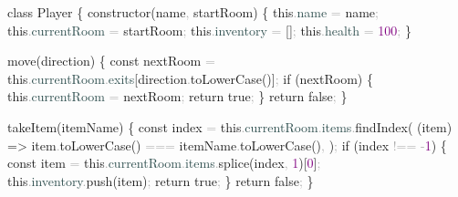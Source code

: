 \documentclass[
  justified,
  openright,
]{tufte-book}
\newcommand{\AttributeTok}[1]{\textcolor{DarkSlateGray}{#1}}
\newcommand{\ControlFlowTok}[1]{\textcolor{BrandBlue}{#1}}
\newcommand{\DecValTok}[1]{\textcolor{Purple}{#1}}
\newcommand{\FunctionTok}[1]{\textcolor{BrandBlue}{#1}}
\newcommand{\KeywordTok}[1]{\textcolor{BrandBlue}{#1}}
\newcommand{\NormalTok}[1]{#1}
\newcommand{\OperatorTok}[1]{\textcolor{DarkGray}{#1}}
\newenvironment{Shaded}{%
  \begin{snugshade}
}{%
  \end{snugshade}
}
\begin{document}
\begin{Shaded}
\begin{Highlighting}[]
\KeywordTok{class}\NormalTok{ Player \{}
  \FunctionTok{constructor}\NormalTok{(name}\OperatorTok{,}\NormalTok{ startRoom) \{}
    \KeywordTok{this}\OperatorTok{.}\AttributeTok{name} \OperatorTok{=}\NormalTok{ name}\OperatorTok{;}
    \KeywordTok{this}\OperatorTok{.}\AttributeTok{currentRoom} \OperatorTok{=}\NormalTok{ startRoom}\OperatorTok{;}
    \KeywordTok{this}\OperatorTok{.}\AttributeTok{inventory} \OperatorTok{=}\NormalTok{ []}\OperatorTok{;}
    \KeywordTok{this}\OperatorTok{.}\AttributeTok{health} \OperatorTok{=} \DecValTok{100}\OperatorTok{;}
\NormalTok{  \}}

  \FunctionTok{move}\NormalTok{(direction) \{}
    \KeywordTok{const}\NormalTok{ nextRoom }\OperatorTok{=} \KeywordTok{this}\OperatorTok{.}\AttributeTok{currentRoom}\OperatorTok{.}\AttributeTok{exits}\NormalTok{[direction}\OperatorTok{.}\FunctionTok{toLowerCase}\NormalTok{()]}\OperatorTok{;}
    \ControlFlowTok{if}\NormalTok{ (nextRoom) \{}
      \KeywordTok{this}\OperatorTok{.}\AttributeTok{currentRoom} \OperatorTok{=}\NormalTok{ nextRoom}\OperatorTok{;}
      \ControlFlowTok{return} \KeywordTok{true}\OperatorTok{;}
\NormalTok{    \}}
    \ControlFlowTok{return} \KeywordTok{false}\OperatorTok{;}
\NormalTok{  \}}

  \FunctionTok{takeItem}\NormalTok{(itemName) \{}
    \KeywordTok{const}\NormalTok{ index }\OperatorTok{=} \KeywordTok{this}\OperatorTok{.}\AttributeTok{currentRoom}\OperatorTok{.}\AttributeTok{items}\OperatorTok{.}\FunctionTok{findIndex}\NormalTok{(}
\NormalTok{      (item) }\KeywordTok{=\textgreater{}}\NormalTok{ item}\OperatorTok{.}\FunctionTok{toLowerCase}\NormalTok{() }\OperatorTok{===}\NormalTok{ itemName}\OperatorTok{.}\FunctionTok{toLowerCase}\NormalTok{()}\OperatorTok{,}
\NormalTok{    )}\OperatorTok{;}
    \ControlFlowTok{if}\NormalTok{ (index }\OperatorTok{!==} \OperatorTok{{-}}\DecValTok{1}\NormalTok{) \{}
      \KeywordTok{const}\NormalTok{ item }\OperatorTok{=} \KeywordTok{this}\OperatorTok{.}\AttributeTok{currentRoom}\OperatorTok{.}\AttributeTok{items}\OperatorTok{.}\FunctionTok{splice}\NormalTok{(index}\OperatorTok{,} \DecValTok{1}\NormalTok{)[}\DecValTok{0}\NormalTok{]}\OperatorTok{;}
      \KeywordTok{this}\OperatorTok{.}\AttributeTok{inventory}\OperatorTok{.}\FunctionTok{push}\NormalTok{(item)}\OperatorTok{;}
      \ControlFlowTok{return} \KeywordTok{true}\OperatorTok{;}
\NormalTok{    \}}
    \ControlFlowTok{return} \KeywordTok{false}\OperatorTok{;}
\NormalTok{  \}}


\end{Highlighting}
\end{Shaded}
\end{document}
